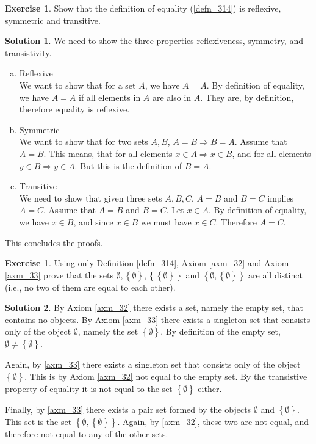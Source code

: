 \documentclass[a4paper, twocolumn]{report}
\newcounter{exercise} \numberwithin{exercise}{section}
\theoremstyle{definition}
\newtheorem{exc}[exercise]{Exercise}
\theoremstyle{solution}
\newtheorem*{sltn}{Solution}
\begin{document}
\begin{exc}
  Show that the definition of equality (\ref{defn_314}) is reflexive, symmetric
  and transitive. 
\end{exc}
\begin{sltn}
  We need to show the three properties reflexiveness, symmetry, and transistivity.  
  \begin{enumerate}[(a)]
    \item Reflexive \\
      [0.2cm]
      We want to show that for a set $A$, we have $A = A$.
      By definition of equality, we have $A = A$ if all elements in $A$ are also in $A$.
      They are, by definition, therefore equality is reflexive.
    \item Symmetric \\
      [0.2cm]
      We want to show that for two sets $A, B$, $A = B \Longrightarrow B = A$.
      Assume that $A = B$. This means, that for all elements $x \in A \Longrightarrow x \in B$, and
      for all elements $y \in B \Longrightarrow y \in A$. But this is the definition of $B = A$.
    \item Transitive \\
      [0.2cm]
      We need to show that given three sets $A, B, C$, $A = B$ and $B = C$
      implies $A = C$.  Assume that $A = B$ and $B = C$. Let $x \in A$. By
      definition of equality, we have $x \in B$, and since $x \in B$ we must
      have $x \in C$. Therefore $A = C$.
  \end{enumerate}
  This concludes the proofs.
\end{sltn}

\begin{exc}
  Using only Definition \ref{defn_314}, Axiom \ref{axm_32} and Axiom
  \ref{axm_33} prove that the sets $\emptyset, \left\{ \emptyset \right\},
  \left\{ \left\{ \emptyset\right\} \right\}$ and $\left\{ \emptyset, \left\{
    \emptyset \right\}  \right\}$ are all distinct (i.e., no two of them are
  equal to each other).
\end{exc}

\begin{sltn}
  By Axiom \ref{axm_32} there exists a set, namely the empty set, that contains
  no objects.  By Axiom \ref{axm_33} there exists a singleton set that consists
  only of the object $\emptyset$, namely the set $\left\{ \emptyset \right\}$.
  By definition of the empty set, $\emptyset \neq \left\{ \emptyset \right\}$.

  Again, by \ref{axm_33} there exists a singleton set that consists only of the
  object $\left\{ \emptyset \right\}$.  This is by Axiom \ref{axm_32} not equal
  to the empty set. By the transistive property of equality it is not equal to
  the set $\left\{ \emptyset \right\}$ either.

  Finally, by \ref{axm_33} there exists a pair set formed by the objects
  $\emptyset$ and $\left\{ \emptyset \right\}$.  This set is the set $\left\{
  \emptyset, \left\{ \emptyset \right\} \right\}$. Again, by \ref{axm_32},
  these two are not equal, and therefore not equal to any of the other sets.

\end{sltn}
\end{document}
